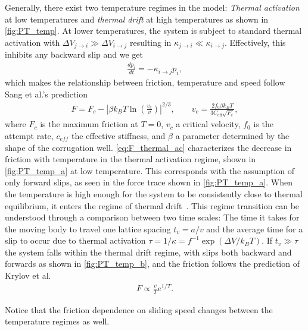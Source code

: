 Generally, there exist two temperature regimes in the model: \textit{Thermal activation} at low temperatures and \textit{thermal drift} at high temperatures as shown in \cref{fig:PT_temp}. At lower temperatures, the system is subject to standard thermal activation with $\Delta V_{j \to i} \gg \Delta V_{i \to j}$ resulting in  $\kappa_{j \to i} \ll \kappa_{i \to j}$. Effectively, this inhibits any backward slip and we get  
\begin{align*}
  \frac{dp_i}{dt} = -\kappa_{i\to j}p_i,
\end{align*}
which makes the relationship between friction, temperature and speed follow Sang et al.’s prediction~\cite{Sang_2001}
\begin{align}
  F=F_c-\left|\beta k_B T \ln \left(\frac{v_c}{v}\right)\right|^{2 / 3}, \qquad v_c = \frac{2f_0\beta k_B T}{3 C_{\text{eff}} \sqrt{F_c}},
  \label{eq:F_thermal_ac}
\end{align}
where $F_c$ is the maximum friction at $T = 0$, $v_c$ a critical velocity, $f_0$
is the attempt rate, $c_{eff}$ the effective stiffness, and $\beta$ a
parameter determined by the shape of the corrugation well.
\cref{eq:F_thermal_ac} characterizes the decrease in friction with temperature
in the thermal activation regime, shown in \cref{fig:PT_temp_a} at low temperature. This corresponds with the assumption of only forward slips, as seen in the force trace shown in \cref{fig:PT_temp_a}. When the temperature is high enough for the system to be consistently close to thermal equilibrium, it enters the regime of thermal drift~\cite{PhysRevE.71.065101}. This regime transition can be understood through a comparison between two time scales: The time it takes for the moving body to travel one lattice spacing
$t_v = a/v$ and the average time for a slip to occur due to thermal activation
$\tau = 1/\kappa = f^{-1}\exp(\Delta V / k_BT)$. If $t_v \gg \tau$ the system falls within the thermal drift regime, with slips both backward and forwards as shown in \cref{fig:PT_temp_b}, and the friction follows the prediction of Krylov et
al.~\cite{Krylow_2007, PhysRevE.71.065101, Jinesh_2008}
\begin{align}
  F \propto \frac{v}{T}e^{1/T}.
  \label{eq:PT_thermal_drift}
\end{align}

Notice that the friction dependence on sliding speed changes between the temperature regimes as well.



  


